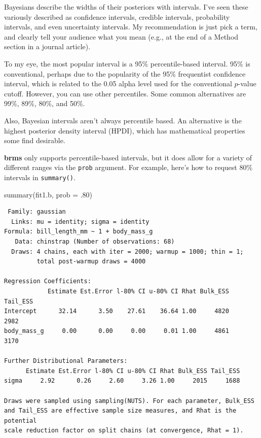 \documentclass[
  letterpaper,
  DIV=11,
  numbers=noendperiod]{scrartcl}
\newenvironment{Shaded}{\begin{snugshade}}{\end{snugshade}}
\newcommand{\AttributeTok}[1]{\textcolor[rgb]{0.40,0.45,0.13}{#1}}
\newcommand{\DecValTok}[1]{\textcolor[rgb]{0.68,0.00,0.00}{#1}}
\newcommand{\FunctionTok}[1]{\textcolor[rgb]{0.28,0.35,0.67}{#1}}
\newcommand{\NormalTok}[1]{\textcolor[rgb]{0.00,0.23,0.31}{#1}}
\begin{document}
Bayesians describe the widths of their posteriors with intervals. I've
seen these variously described as confidence intervals, credible
intervals, probability intervals, and even uncertainty intervals. My
recommendation is just pick a term, and clearly tell your audience what
you mean (e.g., at the end of a Method section in a journal article).

To my eye, the most popular interval is a 95\% percentile-based
interval. 95\% is conventional, perhaps due to the popularity of the
95\% frequentist confidence interval, which is related to the 0.05 alpha
level used for the conventional \(p\)-value cutoff. However, you can use
other percentiles. Some common alternatives are 99\%, 89\%, 80\%, and
50\%.

Also, Bayesian intervals aren't always percentile based. An alternative
is the highest posterior density interval (HPDI), which has mathematical
properties some find desirable.

\textbf{brms} only supports percentile-based intervals, but it does
allow for a variety of different ranges via the \texttt{prob} argument.
For example, here's how to request 80\% intervals in \texttt{summary()}.

\begin{Shaded}
\begin{Highlighting}[]
\FunctionTok{summary}\NormalTok{(fit1.b, }\AttributeTok{prob =}\NormalTok{ .}\DecValTok{80}\NormalTok{)}
\end{Highlighting}
\end{Shaded}

\begin{verbatim}
 Family: gaussian 
  Links: mu = identity; sigma = identity 
Formula: bill_length_mm ~ 1 + body_mass_g 
   Data: chinstrap (Number of observations: 68) 
  Draws: 4 chains, each with iter = 2000; warmup = 1000; thin = 1;
         total post-warmup draws = 4000

Regression Coefficients:
            Estimate Est.Error l-80% CI u-80% CI Rhat Bulk_ESS Tail_ESS
Intercept      32.14      3.50    27.61    36.64 1.00     4820     2982
body_mass_g     0.00      0.00     0.00     0.01 1.00     4861     3170

Further Distributional Parameters:
      Estimate Est.Error l-80% CI u-80% CI Rhat Bulk_ESS Tail_ESS
sigma     2.92      0.26     2.60     3.26 1.00     2015     1688

Draws were sampled using sampling(NUTS). For each parameter, Bulk_ESS
and Tail_ESS are effective sample size measures, and Rhat is the potential
scale reduction factor on split chains (at convergence, Rhat = 1).
\end{verbatim}
\end{document}
